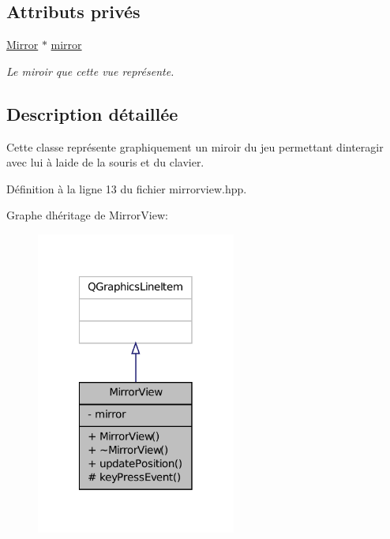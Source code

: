 \subsection*{Attributs privés}
\begin{DoxyCompactItemize}
\item 
\hyperlink{classMirror}{Mirror} $\ast$ \hyperlink{classMirrorView_aa470a75e02117480ff188e6a12583ffe}{mirror}
\begin{DoxyCompactList}\small\item\em Le miroir que cette vue représente. \end{DoxyCompactList}\end{DoxyCompactItemize}


\subsection{Description détaillée}
Cette classe représente graphiquement un miroir du jeu permettant d\textquotesingle{}interagir avec lui à l\textquotesingle{}aide de la souris et du clavier. 

Définition à la ligne 13 du fichier mirrorview.\+hpp.



Graphe d\textquotesingle{}héritage de Mirror\+View\+:\nopagebreak
\begin{figure}[H]
\begin{center}
\leavevmode
\includegraphics[width=186pt]{d2/d7b/classMirrorView__inherit__graph}
\end{center}
\end{figure}


